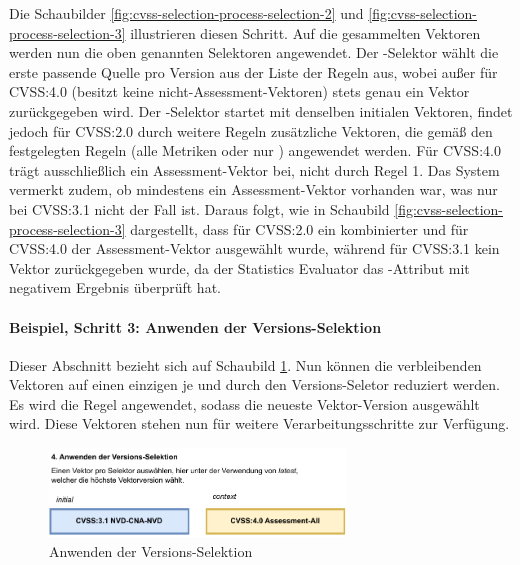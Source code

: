 Die Schaubilder \ref{fig:cvss-selection-process-selection-2} und \ref{fig:cvss-selection-process-selection-3} illustrieren diesen Schritt.
Auf die gesammelten Vektoren werden nun die oben genannten Selektoren angewendet.
Der -Selektor wählt die erste passende Quelle pro Version aus der Liste der Regeln aus, wobei außer für CVSS:4.0 (besitzt keine nicht-Assessment-Vektoren) stets genau ein Vektor zurückgegeben wird.
Der -Selektor startet mit denselben initialen Vektoren, findet jedoch für CVSS:2.0 durch weitere Regeln zusätzliche Vektoren, die gemäß den festgelegten Regeln (alle Metriken oder nur ) angewendet werden.
Für CVSS:4.0 trägt ausschließlich ein Assessment-Vektor bei, nicht durch Regel 1.
Das System vermerkt zudem, ob mindestens ein Assessment-Vektor vorhanden war, was nur bei CVSS:3.1 nicht der Fall ist.
Daraus folgt, wie in Schaubild \ref{fig:cvss-selection-process-selection-3} dargestellt, dass für CVSS:2.0 ein kombinierter und für CVSS:4.0 der Assessment-Vektor ausgewählt wurde, während für CVSS:3.1 kein Vektor zurückgegeben wurde, da der Statistics Evaluator das -Attribut mit negativem Ergebnis überprüft hat.

\paragraph{Beispiel, Schritt 3: Anwenden der Versions-Selektion} \label{par:projektbericht-loesungsweg-cvss-selection-example-step-4}

Dieser Abschnitt bezieht sich auf Schaubild \ref{fig:cvss-selection-process-selection-4}.
Nun können die verbleibenden Vektoren auf einen einzigen je  und  durch den Versions-Seletor reduziert werden.
Es wird die Regel  angewendet, sodass die neueste Vektor-Version ausgewählt wird.
Diese Vektoren stehen nun für weitere Verarbeitungsschritte zur Verfügung.

\begin{figure}[htbp] %
    \centering
    \includegraphics[width=0.7\textwidth, keepaspectratio]{res/grafiken/cvss-selection-process-selection-4}
    \caption{Anwenden der Versions-Selektion}
    \label{fig:cvss-selection-process-selection-4}
\end{figure}
